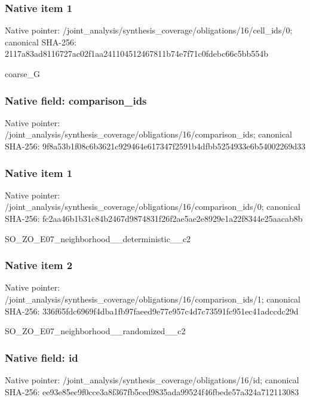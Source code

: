 \documentclass[10pt,a4paper]{article}
\begin{document}
\subsubsection{Native item 1}
Native pointer: /joint\_\allowbreak{}analysis/synthesis\_\allowbreak{}coverage/obligations/16/cell\_\allowbreak{}ids/0; canonical SHA-256: 2117a83ad8116727ac02f1aa241104512467811b74e7f71c0fdebc66c5bb554b

\begingroup\raggedright\sloppy coarse\_\allowbreak{}G\par\endgroup

\subsubsection{Native field: comparison\_\allowbreak{}ids}
Native pointer: /joint\_\allowbreak{}analysis/synthesis\_\allowbreak{}coverage/obligations/16/comparison\_\allowbreak{}ids; canonical SHA-256: 9f8a53b1f08c6b3621c929464e617347f2591b4dfbb5254933e6b54002269d33

\subsubsection{Native item 1}
Native pointer: /joint\_\allowbreak{}analysis/synthesis\_\allowbreak{}coverage/obligations/16/comparison\_\allowbreak{}ids/0; canonical SHA-256: fc2aa46b1b31c84b2467d9874831f26f2ae5ae2e8929e1a22f8344e25aacab8b

\begingroup\raggedright\sloppy SO\_\allowbreak{}ZO\_\allowbreak{}E07\_\allowbreak{}neighborhood\_\allowbreak{}\_\allowbreak{}deterministic\_\allowbreak{}\_\allowbreak{}c2\par\endgroup

\subsubsection{Native item 2}
Native pointer: /joint\_\allowbreak{}analysis/synthesis\_\allowbreak{}coverage/obligations/16/comparison\_\allowbreak{}ids/1; canonical SHA-256: 336f65fdc6969f4dba1fb97faeed9e77e957c4d7c73591fc951ec41adccdc29d

\begingroup\raggedright\sloppy SO\_\allowbreak{}ZO\_\allowbreak{}E07\_\allowbreak{}neighborhood\_\allowbreak{}\_\allowbreak{}randomized\_\allowbreak{}\_\allowbreak{}c2\par\endgroup

\subsubsection{Native field: id}
Native pointer: /joint\_\allowbreak{}analysis/synthesis\_\allowbreak{}coverage/obligations/16/id; canonical SHA-256: ee93e85ec9f0cce3a8f367fb5ced9835ada99524f46fbede57a324a712113083
\end{document}
